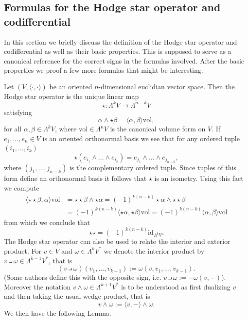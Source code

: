 \subsection{Formulas for the Hodge star operator and codifferential}

In this section we briefly discuss the definition of the Hodge star operator and codifferential as well as their basic properties. This is supposed to serve as a canonical reference for the correct signs in the formulas involved. After the basic properties we proof a few more formulas that might be interesting. 

\par

Let $(V,\langle\cdot,\cdot\rangle)$ be an oriented $n$-dimensional euclidian vector space. Then the Hodge star operator is the unique linear map 
\[
\star \colon \Lambda^kV \to \Lambda^{n-k}V
\]
satisfying 
\[
\alpha \wedge \star \beta = \langle\alpha,\beta\rangle \mathrm{vol},
\]
for all $\alpha,\beta \in \Lambda^k V$, where $\mathrm{vol} \in \Lambda^nV$ is the canonical volume form on $V$. If $e_1,\ldots,e_n \in V$ is an oriented orthonormal basis we see that for any ordered tuple $(i_1,\ldots,i_k)$
\[
\star(e_{i_1} \wedge \ldots \wedge e_{i_k}) = e_{j_1} \wedge \ldots \wedge e_{j_{n-k}},
\]
where $(j_1,\ldots,j_{n-k})$ is the complementary ordered tuple. Since tuples of this form define an orthonormal basis it follows that $\star$ is an isometry. Using this fact we compute
\begin{align*}
    \langle\star\star\beta,\alpha\rangle \mathrm{vol} &= \star\star\beta\wedge\star\alpha = (-1)^{k(n-k)}\star\alpha\wedge\star\star\beta \\ 
    &= (-1)^{k(n-k)}\langle\star\alpha,\star\beta\rangle\mathrm{vol}
    = (-1)^{k(n-k)}\langle\alpha,\beta\rangle\mathrm{vol}
\end{align*}
from which we conclude that 
\[
\star\star = (-1)^{k(n-k)} \mathrm{id}_{\Lambda^kV}.
\]
The Hodge star operator can also be used to relate the interior and exterior product. For $v \in V$ and $\omega \in \Lambda^k V^\ast$ we denote the interior product by $v \intprod \omega \in \Lambda^{k-1}V^\ast$, that is
\[
(v \intprod \omega )(v_1,\ldots,v_{k-1}) := \omega(v,v_1,\ldots,v_{k-1}).
\]
(Some authors define this with the opposite sign, i.e. $v \intprod \omega := - \omega(v,-)$). Moreover the notation $v \wedge \omega \in \Lambda^{k+1}V^\ast$ is to be understood as first dualizing $v$ and then taking the usual wedge product, that is 
\[
v \wedge \omega := \langle v,-\rangle\wedge\omega.
\]
We then have the following Lemma.

